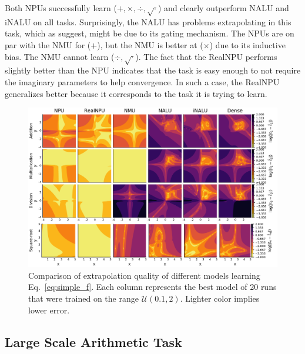 \documentclass[9pt]{article}
\begin{document}
Both NPUs successfully learn ($+,\times,\div,\sqrt{\cdot}$) and clearly
outperform NALU and iNALU on all tasks.
Surprisingly, the NALU has problems extrapolating in this task, which as
\cite{schlor_inalu_2020} suggest, might be due to its gating mechanism.
The NPUs are on par with the NMU for
($+$), but the NMU is better at ($\times$) due to its inductive bias. The NMU
cannot learn ($\div,\sqrt{\cdot}$). The fact that the RealNPU performs slightly better
than the NPU indicates that the task is easy enough to not require the
imaginary parameters to help convergence. In such a case, the RealNPU
generalizes better because it corresponds to the task it
is trying to learn.
\begin{figure}
  \centering
  \includegraphics[width=\linewidth]{simple_err.pdf}
  \caption{Comparison of extrapolation quality of different models learning Eq.~\ref{eq:simple_f}. Each
  column represents the best model of 20 runs that were trained on the range
  $\mathcal{U}(0.1,2)$.  Lighter color implies lower error.}%
  \label{fig:simple_err}
\end{figure}

\subsection{Large Scale Arithmetic Task}%
\label{sub:large_scale_arithmetic_task}
\end{document}
